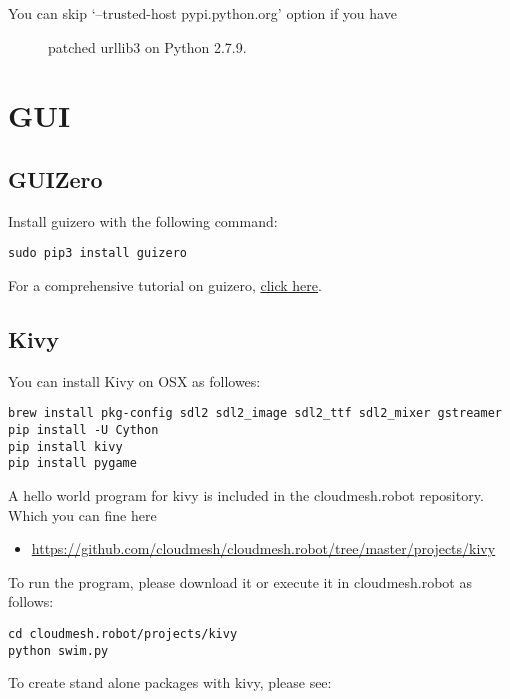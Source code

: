 \begin{description}
\item[You can skip `--trusted-host pypi.python.org' option if you have]
patched urllib3 on Python 2.7.9.
\end{description}

\section{GUI}\label{gui}

\subsection{GUIZero}\label{guizero}

Install guizero with the following command:

\begin{verbatim}
sudo pip3 install guizero
\end{verbatim}

For a comprehensive tutorial on guizero,
\href{https://lawsie.github.io/guizero/howto/}{click here}.

\subsection{Kivy}\label{kivy}

You can install Kivy on OSX as followes:

\begin{verbatim}
brew install pkg-config sdl2 sdl2_image sdl2_ttf sdl2_mixer gstreamer
pip install -U Cython
pip install kivy
pip install pygame
\end{verbatim}

A hello world program for kivy is included in the cloudmesh.robot
repository. Which you can fine here

\begin{itemize}
\tightlist
\item
  \url{https://github.com/cloudmesh/cloudmesh.robot/tree/master/projects/kivy}
\end{itemize}

To run the program, please download it or execute it in cloudmesh.robot
as follows:

\begin{verbatim}
cd cloudmesh.robot/projects/kivy
python swim.py
\end{verbatim}

To create stand alone packages with kivy, please see:

